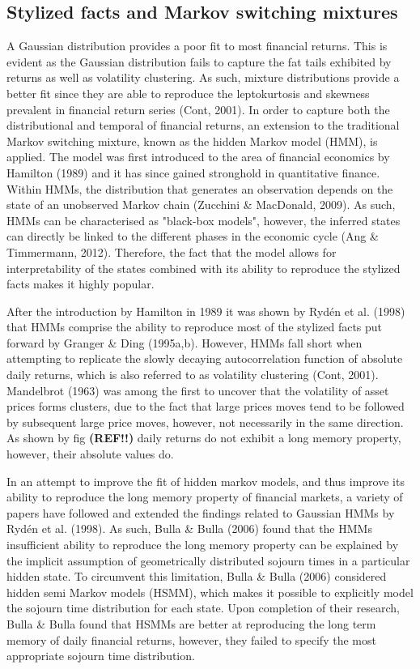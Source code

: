\subsection{Stylized facts and Markov switching mixtures}
A Gaussian distribution provides a poor fit to most financial returns. This is evident as the Gaussian distribution fails to capture the fat tails exhibited by returns as well as volatility clustering. As such, mixture distributions provide a better fit since they are able to reproduce the leptokurtosis and skewness prevalent in financial return series (Cont, 2001). In order to capture both the distributional and temporal of financial returns, an extension to the traditional Markov switching mixture, known as the hidden Markov model (HMM), is applied. The model was first introduced to the area of financial economics by Hamilton (1989) and it has since gained stronghold in quantitative finance. Within HMMs, the distribution that generates an observation depends on the state of an unobserved Markov chain (Zucchini \& MacDonald, 2009). As such, HMMs can be characterised as "black-box models", however, the inferred states can directly be linked to the different phases in the economic cycle (Ang \& Timmermann, 2012). Therefore, the fact that the model allows for interpretability of the states combined with its ability to reproduce the stylized facts makes it highly popular. 

After the introduction by Hamilton in 1989 it was shown by Rydén et al. (1998) that HMMs comprise the ability to reproduce most of the stylized facts put forward by Granger \& Ding (1995a,b). However, HMMs fall short when attempting to replicate the slowly decaying autocorrelation function of absolute daily returns, which is also referred to as volatility clustering (Cont, 2001). Mandelbrot (1963) was among the first to uncover that the volatility of asset prices forms clusters, due to the fact that large prices moves tend to be followed by subsequent large price moves, however, not necessarily in the same direction. As shown by fig \textbf{(REF!!)} daily returns do not exhibit a long memory property, however, their absolute values do. 


In an attempt to improve the fit of hidden markov models, and thus improve its ability to reproduce the long memory property of financial markets, a variety of papers have followed and extended the findings related to Gaussian HMMs by Rydén et al. (1998). As such, Bulla \& Bulla (2006) found that the HMMs insufficient ability to reproduce the long memory property can be explained by the implicit assumption of geometrically distributed sojourn times in a particular hidden state. To circumvent this limitation, Bulla \& Bulla (2006) considered hidden semi Markov models (HSMM), which makes it possible to explicitly model the sojourn time distribution for each state. Upon completion of their research, Bulla \& Bulla found that HSMMs are better at reproducing the long term memory of daily financial returns, however, they failed to specify the most appropriate sojourn time distribution. 

